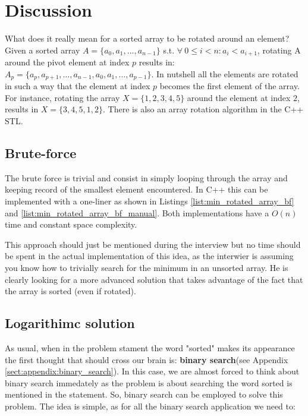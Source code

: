 \section{Discussion}
\label{min_rotated_array:sec:discussion}
What does it really mean for a sorted array to be rotated around an element? Given a sorted array $A=\{a_0, a_1, \ldots,a_{n-1}\}$ s.t. $ \forall \: 0 \leq i < n: a_i < a_{i+1}$, rotating A around the pivot element at index $p$ results in: $A_p=\{a_p, a_{p+1}, \ldots,a_{n-1}, a_0, a_1, \ldots, a_{p-1}\}$. In  nutshell all the elements are rotated in such a way that the element at index $p$ becomes the first element of the array. For instance, rotating the array $X=\{1,2,3,4,5\}$ around the element at index $2$, results in $X=\{3,4,5,1,2\}$.  There is also an array rotation algorithm in the C++ STL\cite{cit::std::rotate}.


\subsection{Brute-force}
\label{min_rotated_array:sec:bruteforce}
The brute force is trivial and consist in simply looping through the array and keeping record of the smallest element encountered. In C++ this can be implemented with a one-liner as shown in Listings \ref{list:min_rotated_array_bf} and \ref{list:min_rotated_array_bf_manual}.
Both implementations have a $O(n)$ time and constant space complexity.





This approach should just be mentioned during the interview but no time should be spent in the actual implementation of this idea, as the interwier is assuming you know how to trivially search for the minimum in an unsorted array. He is clearly looking for a more advanced solution that takes advantage of the fact that the array is sorted (even if rotated).

\subsection{Logarithimc solution}
\label{min_rotated_array:sec:log}
As usual, when in the problem stament the word "sorted" makes its appearance the first thought that should cross our brain is: \textbf{binary search}(see Appendix \ref{sect:appendix:binary_search}). In this case, we are almost forced to think about binary search immedately as the problem is about searching the word sorted is mentioned in the statement. So, binary search can be employed to solve this problem. The idea is simple, as for all the binary search application we need to:


